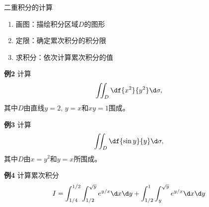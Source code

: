 \begin{frame}{二重积分的计算}
	\linespread{1.2}\pause 
	\begin{enumerate}
	  \item {\bb 画图：}描绘积分区域$D$的图形\pause 
	  \item {\bb 定限：}确定累次积分的积分限\pause 
	  \item {\bb 求积分：}依次计算累次积分的值\pause 
	\end{enumerate}
	\begin{exampleblock}{{\bf 例2}\hfill}
		计算
		$$\iint_D\df{x^2}{y^2}\d\sigma,$$
		其中$D$由直线$y=2,\,y=x$和$xy=1$围成。
	\end{exampleblock}
\end{frame}

\begin{frame}
	\linespread{1.2}
	\begin{exampleblock}{{\bf 例3}\hfill}
		计算
		$$\iint_D\df{\sin y}{y}\d\sigma,$$
		其中$D$由$x=y^2$和$y=x$所围成。
	\end{exampleblock}
	\bigskip\pause 
\end{frame}


\begin{frame}
	\linespread{1.2}
	\begin{exampleblock}{{\bf 例4}\hfill}
		计算累次积分
		$$I=\int_{1/4}^{1/2}\int_{1/2}^{\sqrt y}e^{y/x}\d x\d y+
		\int_{1/2}^1\int_y^{\sqrt y}e^{y/x}\d x\d y$$
	\end{exampleblock}
\end{frame}

